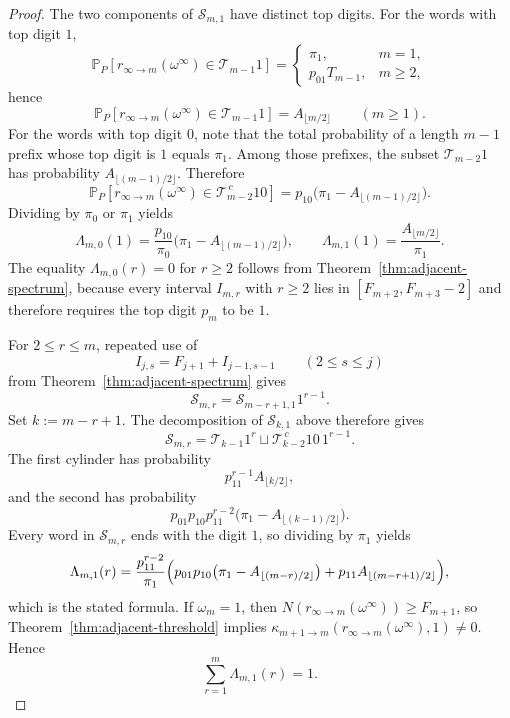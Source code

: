 \documentclass[11pt,reqno]{amsart}
\numberwithin{equation}{section}
\theoremstyle{plain}
\theoremstyle{definition}
\theoremstyle{remark}
\newcommand{\PP}{\mathbb{P}}
\begin{document}
\begin{proof}
The two components of $\mathcal{S}_{m,1}$ have distinct top digits.  For the
words with top digit $1$,
\[
\PP_P[r_{\infty\to m}(\omega^\infty)\in \mathcal{T}_{m-1}1]
=
\begin{cases}
\pi_1,& m=1,\\[4pt]
p_{01}T_{m-1},& m\ge 2,
\end{cases}
\]
hence
\[
\PP_P[r_{\infty\to m}(\omega^\infty)\in \mathcal{T}_{m-1}1]
=
A_{\lfloor m/2\rfloor}
\qquad (m\ge 1).
\]
For the words with top digit $0$, note that the total probability of a length
$m-1$ prefix whose top digit is $1$ equals $\pi_1$.  Among those prefixes, the
subset $\mathcal{T}_{m-2}1$ has probability
$A_{\lfloor (m-1)/2\rfloor}$.  Therefore
\[
\PP_P[r_{\infty\to m}(\omega^\infty)\in \mathcal{T}_{m-2}^{\,c}10]
=
p_{10}\bigl(\pi_1-A_{\lfloor (m-1)/2\rfloor}\bigr).
\]
Dividing by $\pi_0$ or $\pi_1$ yields
\[
\Lambda_{m,0}(1)
=
\frac{p_{10}}{\pi_0}
\bigl(
\pi_1-A_{\lfloor (m-1)/2\rfloor}
\bigr),
\qquad
\Lambda_{m,1}(1)
=
\frac{A_{\lfloor m/2\rfloor}}{\pi_1}.
\]
The equality $\Lambda_{m,0}(r)=0$ for $r\ge 2$ follows from
Theorem~\ref{thm:adjacent-spectrum}, because every interval $I_{m,r}$ with
$r\ge 2$ lies in $[F_{m+2},F_{m+3}-2]$ and therefore requires the top digit
$p_m$ to be $1$.

For $2\le r\le m$, repeated use of
\[
I_{j,s}=F_{j+1}+I_{j-1,s-1}
\qquad (2\le s\le j)
\]
from Theorem~\ref{thm:adjacent-spectrum} gives
\[
\mathcal{S}_{m,r}=\mathcal{S}_{m-r+1,1}1^{r-1}.
\]
Set $k:=m-r+1$.  The decomposition of $\mathcal{S}_{k,1}$ above therefore
gives
\[
\mathcal{S}_{m,r}
=
\mathcal{T}_{k-1}1^r
\sqcup
\mathcal{T}_{k-2}^{\,c}10\,1^{r-1}.
\]
The first cylinder has probability
\[
p_{11}^{r-1}A_{\lfloor k/2\rfloor},
\]
and the second has probability
\[
p_{01}p_{10}p_{11}^{r-2}
\bigl(
\pi_1-A_{\lfloor (k-1)/2\rfloor}
\bigr).
\]
Every word in $\mathcal{S}_{m,r}$ ends with the digit $1$, so dividing by
$\pi_1$ yields
\[
\Lambda_{m,1}(r)
=
\frac{p_{11}^{r-2}}{\pi_1}
\Bigl(
p_{01}p_{10}\bigl(\pi_1-A_{\lfloor (m-r)/2\rfloor}\bigr)
+
p_{11}A_{\lfloor (m-r+1)/2\rfloor}
\Bigr),
\]
which is the stated formula.  If $\omega_m=1$, then
$N(r_{\infty\to m}(\omega^\infty))\ge F_{m+1}$, so
Theorem~\ref{thm:adjacent-threshold} implies
$\kappa_{m+1\to m}(r_{\infty\to m}(\omega^\infty),1)\ne 0$.  Hence
\[
\sum_{r=1}^m\Lambda_{m,1}(r)=1.
\]


\end{proof}
\end{document}
